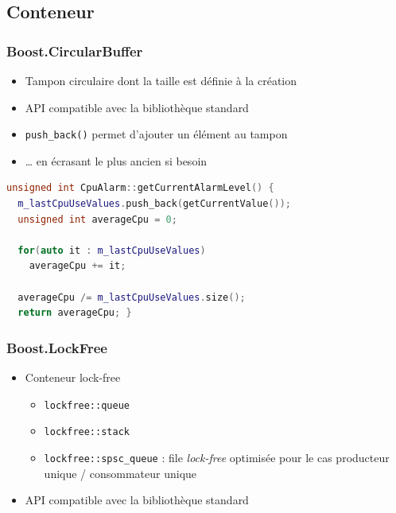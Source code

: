 \documentclass[C++.tex]{subfiles}
\begin{document}
\subsection*{Conteneur}
\begin{frame}[fragile]
	\frametitle{Boost.CircularBuffer}
	\begin{itemize}
		\item Tampon circulaire dont la taille est définie à la création
		\item API compatible avec la bibliothèque standard
		\item \lstinline|push_back()| permet d'ajouter un élément au tampon
		\item \ldots{} en écrasant le plus ancien si besoin
	\end{itemize}

	\begin{lstlisting}[language=C++]
unsigned int CpuAlarm::getCurrentAlarmLevel() {
  m_lastCpuUseValues.push_back(getCurrentValue());
  unsigned int averageCpu = 0;

  for(auto it : m_lastCpuUseValues)
    averageCpu += it;

  averageCpu /= m_lastCpuUseValues.size();
  return averageCpu; }\end{lstlisting}
\end{frame}

\begin{frame}[fragile]
	\frametitle{Boost.LockFree}
	\begin{itemize}
		\item Conteneur lock-free
		\begin{itemize}
			\item \lstinline|lockfree::queue|
			\item \lstinline|lockfree::stack|
			\item \lstinline|lockfree::spsc_queue| : file \textit{lock-free} optimisée pour le cas \og producteur unique / consommateur unique\fg{}
		\end{itemize}
		\item API compatible avec la bibliothèque standard
	\end{itemize}
\end{frame}
\end{document}
